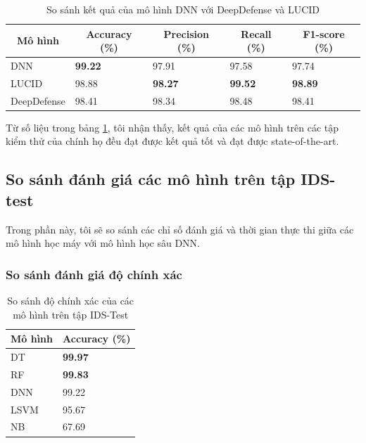 \begin{table}[ht!]
	\begin{tabular}{|l|l|l|l|l|}
		\hline
		\multicolumn{1}{|c|}{\textbf{Mô hình}} &
		\multicolumn{1}{c|}{\textbf{Accuracy (\%)}} &
		\multicolumn{1}{c|}{\textbf{Precision (\%)}} &
		\multicolumn{1}{c|}{\textbf{Recall (\%)}} &
		\multicolumn{1}{c|}{\textbf{F1-score (\%)}} \\ \hline
		DNN         & \textbf{99.22} & 97.91          & 97.58          & 97.74          \\ \hline
		LUCID       & 98.88 & \textbf{98.27} & \textbf{99.52} & \textbf{98.89} \\ \hline
		DeepDefense & 98.41          & 98.34          & 98.48          & 98.41          \\ \hline
	\end{tabular}
\caption{So sánh kết quả của mô hình DNN với DeepDefense và LUCID}
\label{tab:dnn-comparision}
\end{table}

Từ số liệu trong bảng \ref{tab:dnn-comparision}, tôi nhận thấy, kết quả của các mô hình trên các tập kiểm thử của chính họ đều đạt được kết quả tốt và đạt được state-of-the-art.

\subsection{So sánh đánh giá các mô hình trên tập IDS-test}
\label{compare-multi-models}

Trong phần này, tôi sẽ so sánh các chỉ số đánh giá và thời gian thực thi giữa các mô hình học máy với mô hình học sâu DNN.

\subsubsection{So sánh đánh giá độ chính xác}

\begin{table}[ht!]
	\centering
	\begin{tabular}{|l|l|}
		\hline
		\multicolumn{1}{|c|}{\textbf{Mô hình}} & \multicolumn{1}{c|}{\textbf{Accuracy (\%)}} \\ \hline
		DT   & \textbf{99.97} \\ \hline
		RF   & \textbf{99.83} \\ \hline
		DNN  & 99.22          \\ \hline
		LSVM & 95.67          \\ \hline
		NB   & 67.69          \\ \hline
	\end{tabular}
\caption{So sánh độ chính xác của các mô hình trên tập IDS-Test}
\label{tab:compare}
\end{table}

